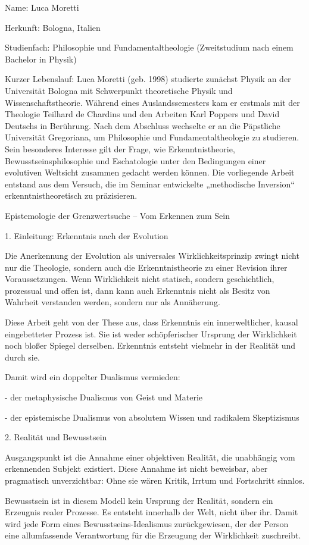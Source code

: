 \documentclass[
  ngerman,
]{article}
\begin{document}
Name: Luca Moretti

Herkunft: Bologna, Italien

Studienfach: Philosophie und Fundamentaltheologie (Zweitstudium nach
einem Bachelor in Physik)

Kurzer Lebenslauf: Luca Moretti (geb. 1998) studierte zunächst Physik an
der Universität Bologna mit Schwerpunkt theoretische Physik und
Wissenschaftstheorie. Während eines Auslandssemesters kam er erstmals
mit der Theologie Teilhard de Chardins und den Arbeiten Karl Poppers und
David Deutschs in Berührung. Nach dem Abschluss wechselte er an die
Päpstliche Universität Gregoriana, um Philosophie und
Fundamentaltheologie zu studieren. Sein besonderes Interesse gilt der
Frage, wie Erkenntnistheorie, Bewusstseinsphilosophie und Eschatologie
unter den Bedingungen einer evolutiven Weltsicht zusammen gedacht werden
können. Die vorliegende Arbeit entstand aus dem Versuch, die im Seminar
entwickelte „methodische Inversion`` erkenntnistheoretisch zu
präzisieren.

Epistemologie der Grenzwertsuche -- Vom Erkennen zum Sein

1. Einleitung: Erkenntnis nach der Evolution

Die Anerkennung der Evolution als universales Wirklichkeitsprinzip
zwingt nicht nur die Theologie, sondern auch die Erkenntnistheorie zu
einer Revision ihrer Voraussetzungen. Wenn Wirklichkeit nicht statisch,
sondern geschichtlich, prozessual und offen ist, dann kann auch
Erkenntnis nicht als Besitz von Wahrheit verstanden werden, sondern nur
als Annäherung.

Diese Arbeit geht von der These aus, dass Erkenntnis ein
innerweltlicher, kausal eingebetteter Prozess ist. Sie ist weder
schöpferischer Ursprung der Wirklichkeit noch bloßer Spiegel derselben.
Erkenntnis entsteht vielmehr in der Realität und durch sie.

Damit wird ein doppelter Dualismus vermieden:

- der metaphysische Dualismus von Geist und Materie

- der epistemische Dualismus von absolutem Wissen und radikalem
Skeptizismus

2. Realität und Bewusstsein

Ausgangspunkt ist die Annahme einer objektiven Realität, die unabhängig
vom erkennenden Subjekt existiert. Diese Annahme ist nicht beweisbar,
aber pragmatisch unverzichtbar: Ohne sie wären Kritik, Irrtum und
Fortschritt sinnlos.

Bewusstsein ist in diesem Modell kein Ursprung der Realität, sondern ein
Erzeugnis realer Prozesse. Es entsteht innerhalb der Welt, nicht über
ihr. Damit wird jede Form eines Bewusstseins-Idealismus zurückgewiesen,
der der Person eine allumfassende Verantwortung für die Erzeugung der
Wirklichkeit zuschreibt.
\end{document}
